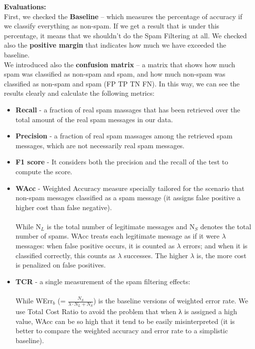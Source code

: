 \documentclass[11pt,a4paper]{article}
\begin{document}
\noindent \textbf{Evaluations:}\\
First, we checked the \textbf{Baseline} – which measures the percentage of accuracy if we classify everything as non-spam. If we get a result that is under this percentage, it means that we shouldn't do the Spam Filtering at all. We checked also the \textbf{positive margin} that indicates how much we have exceeded the baseline.\\
We introduced also the \textbf{confusion matrix} – a matrix that shows how much spam was classified as non-spam and spam, and how much non-spam was classified as non-spam and spam (FP TP TN FN). In this way, we can see the results clearly and calculate the following metrics:
\begin{itemize}
\item \textbf{Recall} - a fraction of real spam massages that has been retrieved over the total amount of the real spam messages in our data.
\item \textbf{Precision} - a fraction of real spam massages among the retrieved spam messages, which are not necessarily real spam messages.
\item \textbf{F1 score} - It considers both the precision and the recall of the test to compute the score.
\item \textbf{WAcc} - Weighted Accuracy measure specially tailored for the scenario that non-spam messages classified as a spam message (it assigns false positive a higher cost than false negative).\\
\\
While N$_{L}$ is the total number of legitimate messages and N$_{S}$ denotes the total number of spams. WAcc treats each legitimate message as if it were ${\lambda}$ messages: when false positive occurs, it is counted as ${\lambda}$ errors; and when it is classiﬁed correctly, this counts as ${\lambda}$ successes. The higher ${\lambda}$ is, the more cost is penalized on false positives.

\item \textbf{TCR} - a single measurement of the spam ﬁltering eﬀects:\\
\\
While WErr$_{b}$ (= $\frac{N_S}{\lambda \cdotp N_L + N_S}$) is the baseline versions of weighted error rate. We use Total Cost Ratio to avoid the problem that when λ is assigned a high value, WAcc can be so high that it tend to be easily misinterpreted (it is better to compare the weighted accuracy and error rate to a simplistic baseline).

\end{itemize}
\end{document}
